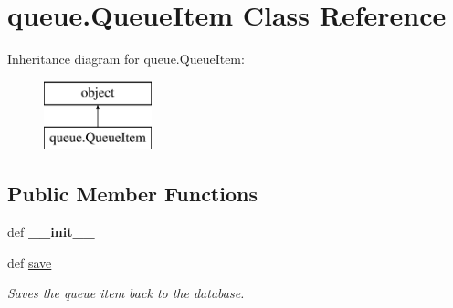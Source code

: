 \hypertarget{classqueue_1_1_queue_item}{\section{queue.\-Queue\-Item Class Reference}
\label{classqueue_1_1_queue_item}
}
Inheritance diagram for queue.\-Queue\-Item\-:\begin{figure}[H]
\begin{center}
\leavevmode
\includegraphics[height=2.000000cm]{classqueue_1_1_queue_item}
\end{center}
\end{figure}
\subsection*{Public Member Functions}
\begin{DoxyCompactItemize}
\item 
\hypertarget{classqueue_1_1_queue_item_ae0d58fab209ae5eed884fb99a0af8686}{def {\bfseries \-\_\-\-\_\-init\-\_\-\-\_\-}}\label{classqueue_1_1_queue_item_ae0d58fab209ae5eed884fb99a0af8686}

\item 
\hypertarget{classqueue_1_1_queue_item_a319a260d27889634770fa945b7b673a8}{def \hyperlink{classqueue_1_1_queue_item_a319a260d27889634770fa945b7b673a8}{save}}\label{classqueue_1_1_queue_item_a319a260d27889634770fa945b7b673a8}

\begin{DoxyCompactList}\small\item\em Saves the queue item back to the database. \end{DoxyCompactList}\end{DoxyCompactItemize}
